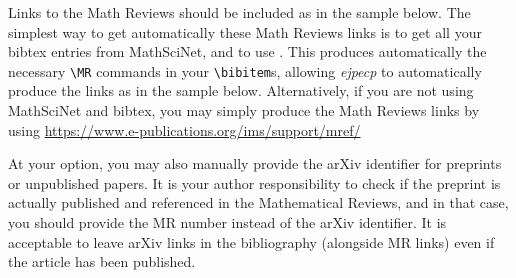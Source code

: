 \documentclass[EJP]{ejpecp} %
\begin{document}
Links to the Math Reviews should be included as in the sample below. The
simplest way to get automatically these Math Reviews links is to get all your
bibtex entries from MathSciNet, and to use
\verb++. This produces automatically the necessary
\verb+\MR+ commands in your \verb+\bibitem+s, allowing \emph{ejpecp} to
automatically produce the links as in the sample below. Alternatively, if you
are not using MathSciNet and bibtex, you may simply produce the Math Reviews
links by using
\url{https://www.e-publications.org/ims/support/mref/}

At your option, you may also manually provide the arXiv identifier for
preprints or unpublished papers. It is your author responsibility to check if
the preprint is actually published and referenced in the Mathematical Reviews,
and in that case, you should provide the MR number instead of the arXiv
identifier. It is acceptable to leave arXiv links in the bibliography
(alongside MR links) even if the article has been published.




%
%

\end{document}
